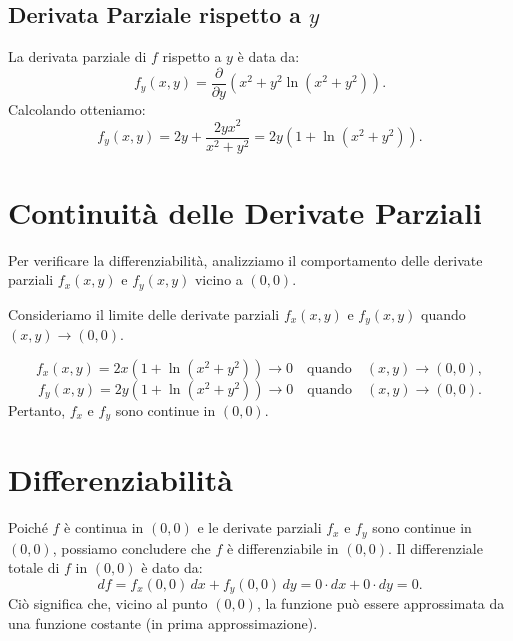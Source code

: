 \documentclass{article}
\begin{document}
\subsection*{Derivata Parziale rispetto a \( y \)}
La derivata parziale di \( f \) rispetto a \( y \) è data da:
\begin{equation*}
f_y(x, y) = \frac{\partial}{\partial y} \left( x^2 + y^2 \ln(x^2 + y^2) \right).
\end{equation*}
Calcolando otteniamo:
\begin{equation*}
f_y(x, y) = 2y + \frac{2y x^2}{x^2 + y^2} = 2y \left(1 + \ln(x^2 + y^2)\right).
\end{equation*}

\section{Continuità delle Derivate Parziali}
Per verificare la differenziabilità, analizziamo il comportamento delle derivate parziali \( f_x(x, y) \) e \( f_y(x, y) \) vicino a \( (0, 0) \).

Consideriamo il limite delle derivate parziali \( f_x(x, y) \) e \( f_y(x, y) \) quando \( (x, y) \to (0, 0) \).

\begin{equation*}
f_x(x, y) = 2x \left(1 + \ln(x^2 + y^2)\right) \to 0 \quad \text{quando} \quad (x, y) \to (0, 0),
\end{equation*}
\begin{equation*}
f_y(x, y) = 2y \left(1 + \ln(x^2 + y^2)\right) \to 0 \quad \text{quando} \quad (x, y) \to (0, 0).
\end{equation*}
Pertanto, \( f_x \) e \( f_y \) sono continue in \( (0, 0) \).

\section{Differenziabilità}
Poiché \( f \) è continua in \( (0, 0) \) e le derivate parziali \( f_x \) e \( f_y \) sono continue in \( (0, 0) \), possiamo concludere che \( f \) è differenziabile in \( (0, 0) \). Il differenziale totale di \( f \) in \( (0, 0) \) è dato da:
\begin{equation*}
df = f_x(0, 0) \, dx + f_y(0, 0) \, dy = 0 \cdot dx + 0 \cdot dy = 0.
\end{equation*}
Ciò significa che, vicino al punto \( (0, 0) \), la funzione può essere approssimata da una funzione costante (in prima approssimazione).
\end{document}
